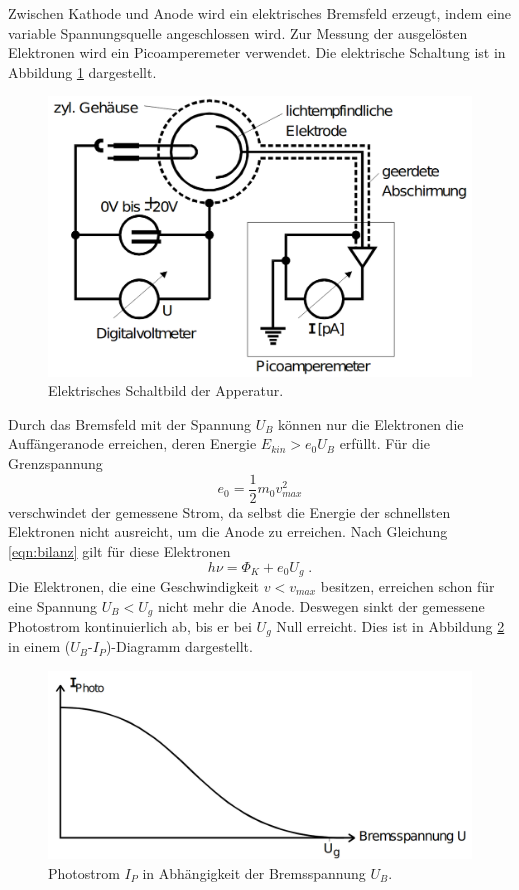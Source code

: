 \noindent
Zwischen Kathode und Anode wird ein elektrisches Bremsfeld erzeugt, indem eine variable Spannungsquelle angeschlossen wird. Zur Messung der
ausgelösten Elektronen wird ein Picoamperemeter verwendet. Die elektrische Schaltung ist in Abbildung \ref{fig:Schaltung} dargestellt.
\begin{figure}
    \centering
    \includegraphics[scale=0.3]{pictures/ElektischeSchaltung.png}
    \caption{Elektrisches Schaltbild der Apperatur. \cite{AP01}}
    \label{fig:Schaltung}
\end{figure}

\noindent
Durch das Bremsfeld mit der Spannung $U_B$ können nur die Elektronen die Auffängeranode erreichen, deren Energie $E_{kin}>e_0U_B$ erfüllt.
Für die Grenzspannung
\begin{equation}
    e_0=\frac{1}{2}m_0v_{max}^2
\end{equation}
verschwindet der gemessene Strom, da selbst die Energie der schnellsten Elektronen nicht ausreicht, um die Anode zu erreichen. Nach
Gleichung \eqref{eqn:bilanz} gilt für diese Elektronen
\begin{equation}
    h\nu=\Phi_K+e_0U_g\;.
\end{equation}
Die Elektronen, die eine Geschwindigkeit $v<v_{max}$ besitzen, erreichen schon für eine Spannung $U_B<U_g$ nicht mehr die Anode. Deswegen
sinkt der gemessene Photostrom kontinuierlich ab, bis er bei $U_g$ Null erreicht. Dies ist in Abbildung \ref{fig:Photostrom} in einem
($U_B$-$I_P$)-Diagramm dargestellt.

\begin{figure}
    \centering
    \includegraphics[scale=0.3]{pictures/Photostrom.png}
    \caption{Photostrom $I_{P}$ in Abhängigkeit der Bremsspannung $U_B$. \cite{AP01}}
    \label{fig:Photostrom}
\end{figure}

